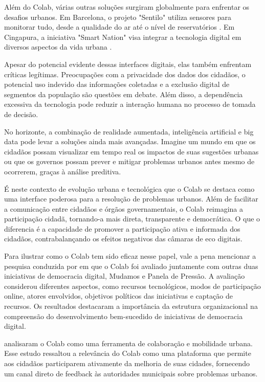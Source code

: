 Além do Colab, várias outras soluções surgiram globalmente para enfrentar os desafios urbanos. Em Barcelona, o projeto "Sentilo" utiliza sensores para monitorar tudo, desde a qualidade do ar até o nível de reservatórios \cite{2016_Sinaee_IP}. Em Cingapura, a iniciativa "Smart Nation" visa integrar a tecnologia digital em diversos aspectos da vida urbana \cite{2016_Chia_IP}.

Apesar do potencial evidente dessas interfaces digitais, elas também enfrentam críticas legítimas. Preocupações com a privacidade dos dados dos cidadãos, o potencial uso indevido das informações coletadas e a exclusão digital de segmentos da população são questões em debate. Além disso, a dependência excessiva da tecnologia pode reduzir a interação humana no processo de tomada de decisão.

No horizonte, a combinação de realidade aumentada, inteligência artificial e big data pode levar a soluções ainda mais avançadas. Imagine um mundo em que os cidadãos possam visualizar em tempo real os impactos de suas sugestões urbanas ou que os governos possam prever e mitigar problemas urbanos antes mesmo de ocorrerem, graças à análise preditiva.

É neste contexto de evolução urbana e tecnológica que o Colab se destaca como uma interface poderosa para a resolução de problemas urbanos. Além de facilitar a comunicação entre cidadãos e órgãos governamentais, o Colab reimagina a participação cidadã, tornando-a mais direta, transparente e democrática. O que o diferencia é a capacidade de promover a participação ativa e informada dos cidadãos, contrabalançando os efeitos negativos das câmaras de eco digitais.

Para ilustrar como o Colab tem sido eficaz nesse papel, vale a pena mencionar a pesquisa conduzida por  em que o Colab foi avaliado juntamente com outras duas iniciativas de democracia digital, Mudamos e Panela de Pressão. A avaliação considerou diferentes aspectos, como recursos tecnológicos, modos de participação online, atores envolvidos, objetivos políticos das iniciativas e captação de recursos. Os resultados destacaram a importância da estrutura organizacional na compreensão do desenvolvimento bem-sucedido de iniciativas de democracia digital.

 analisaram o Colab como uma ferramenta de colaboração e mobilidade urbana. Esse estudo ressaltou a relevância do Colab como uma plataforma que permite aos cidadãos participarem ativamente da melhoria de suas cidades, fornecendo um canal direto de feedback às autoridades municipais sobre problemas urbanos.

